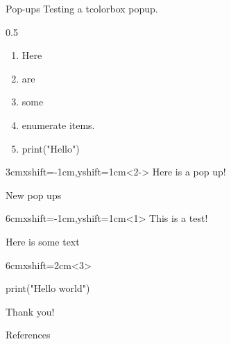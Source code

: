 \documentclass{./slides-math}
\begin{document}
\begin{frame}[fragile]{Pop-ups}
  Testing a tcolorbox popup.
  \begin{overlayarea}{\textwidth}{0.5\textheight}
    \begin{enumerate}[<+->]
    \item Here
    \item are
    \item some
    \item enumerate items.
    \item \begin{Piton}
print("Hello")
    \end{Piton}
    \end{enumerate}
  \end{overlayarea}

  \begin{smpopupbox}{3cm}{xshift=-1cm,yshift=1cm}<2->
    Here is a pop up!
  \end{smpopupbox}
\end{frame}

\begin{frame}[fragile]{New pop ups}
  \begin{smpopupbox}{6cm}{xshift=-1cm,yshift=1cm}<1>
    This is a test!
  \end{smpopupbox}
  \pause%
  Here is some text
  \pause%
  \begin{smpopupbox}{6cm}{xshift=2cm}<3>
    \begin{Piton}
print("Hello world")
    \end{Piton}
  \end{smpopupbox}
\end{frame}

\begin{frame}[standout]
  Thank you!
\end{frame}

\begin{frame}[allowframebreaks]{References}
  \printbibliography[heading=none]
\end{frame}
\end{document}
